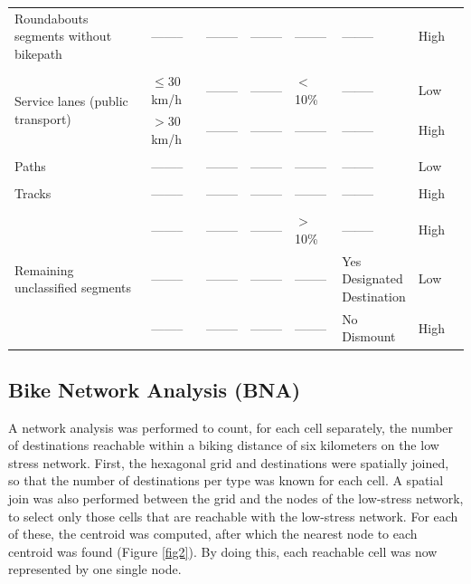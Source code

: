 \documentclass[information,article,submit,moreauthors,pdftex,10pt,a4paper]{mdpi}
\theoremstyle{mdpi}
\newcounter{ex}
\newcounter{re}
\theoremstyle{mdpidefinition}
\begin{document}
\begin{table}[H]
\begin{center}
\begin{tabular}{m{3.2cm} >{\centering}m{2cm} >{\centering}m{2cm} >{\centering}m{2cm} >{\centering}m{1.3cm} >{\centering}m{} >{\centering}m{1.7cm} @{}m{0pt}@{}}
			\raggedright Roundabouts segments without bikepath & -------- & -------- & -------- & -------- & -------- & High & \tabularnewline [10pt]
			\hdashline \tabularnewline [-5pt]	
			\multirow{2}{3cm}{Service lanes (public transport)} & $\mathbf{\leq}$30 km/h & -------- & -------- & $\mathbf{<}$10\% & -------- & Low & \tabularnewline [10pt]
			& $\mathbf{>}$30 km/h & -------- & -------- &  -------- & -------- & High & \tabularnewline [10pt]
			\hdashline \tabularnewline [-5pt]	
			Paths & -------- & -------- & -------- & -------- & -------- & Low & \tabularnewline [10pt]
			\hdashline \tabularnewline [-5pt]	
			Tracks & -------- & -------- & -------- & -------- & -------- & High & \tabularnewline [10pt]
			\hdashline \tabularnewline [-5pt]	
			\multirow{3}{3cm}{Remaining unclassified segments} & -------- & -------- & -------- & $\mathbf{>}$10\% & -------- & High & \tabularnewline [15pt]
			& -------- & -------- & -------- & -------- & \pbox{4cm}{Yes \\ Designated \\ Destination} & Low & \tabularnewline[30pt]
			& -------- & -------- & -------- & -------- & \pbox{4cm}{No \\ Dismount} & High & \tabularnewline [20pt]
			\hline
		\end{tabular}
	\end{center}
\end{table}

\bigskip

\subsection{Bike Network Analysis (BNA)} \label{bna}

A network analysis was performed to count, for each cell separately, the number of destinations reachable within a biking distance of six kilometers on the low stress network. First, the hexagonal grid and destinations were spatially joined, so that the number of destinations per type was known for each cell. A spatial join was also performed between the grid and the nodes of the low-stress network, to select only those cells that are reachable with the low-stress network. For each of these, the centroid was computed, after which the nearest node to each centroid was found (Figure \ref{fig2}). By doing this, each reachable cell was now represented by one single node.
\end{document}
